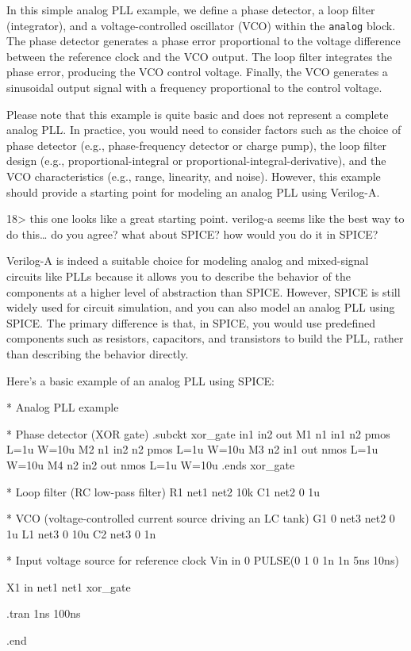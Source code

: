 \documentclass[
]{article}
\newenvironment{Shaded}{}{}
\newcommand{\NormalTok}[1]{#1}
\begin{document}
In this simple analog PLL example, we define a phase detector, a loop
filter (integrator), and a voltage-controlled oscillator (VCO) within
the \texttt{analog} block. The phase detector generates a phase error
proportional to the voltage difference between the reference clock and
the VCO output. The loop filter integrates the phase error, producing
the VCO control voltage. Finally, the VCO generates a sinusoidal output
signal with a frequency proportional to the control voltage.

Please note that this example is quite basic and does not represent a
complete analog PLL. In practice, you would need to consider factors
such as the choice of phase detector (e.g., phase-frequency detector or
charge pump), the loop filter design (e.g., proportional-integral or
proportional-integral-derivative), and the VCO characteristics (e.g.,
range, linearity, and noise). However, this example should provide a
starting point for modeling an analog PLL using Verilog-A.

18\textgreater{} this one looks like a great starting point. verilog-a
seems like the best way to do this\ldots{} do you agree? what about
SPICE? how would you do it in SPICE?

Verilog-A is indeed a suitable choice for modeling analog and
mixed-signal circuits like PLLs because it allows you to describe the
behavior of the components at a higher level of abstraction than SPICE.
However, SPICE is still widely used for circuit simulation, and you can
also model an analog PLL using SPICE. The primary difference is that, in
SPICE, you would use predefined components such as resistors,
capacitors, and transistors to build the PLL, rather than describing the
behavior directly.

Here's a basic example of an analog PLL using SPICE:

\begin{Shaded}
\begin{Highlighting}[]
\NormalTok{* Analog PLL example}

\NormalTok{* Phase detector (XOR gate)}
\NormalTok{.subckt xor\_gate in1 in2 out}
\NormalTok{  M1 n1 in1 n2 pmos L=1u W=10u}
\NormalTok{  M2 n1 in2 n2 pmos L=1u W=10u}
\NormalTok{  M3 n2 in1 out nmos L=1u W=10u}
\NormalTok{  M4 n2 in2 out nmos L=1u W=10u}
\NormalTok{.ends xor\_gate}

\NormalTok{* Loop filter (RC low{-}pass filter)}
\NormalTok{R1 net1 net2 10k}
\NormalTok{C1 net2 0 1u}

\NormalTok{* VCO (voltage{-}controlled current source driving an LC tank)}
\NormalTok{G1 0 net3 net2 0 1u}
\NormalTok{L1 net3 0 10u}
\NormalTok{C2 net3 0 1n}

\NormalTok{* Input voltage source for reference clock}
\NormalTok{Vin in 0 PULSE(0 1 0 1n 1n 5ns 10ns)}

\NormalTok{X1 in net1 net1 xor\_gate}

\NormalTok{.tran 1ns 100ns}

\NormalTok{.end}
\end{Highlighting}
\end{Shaded}
\end{document}
